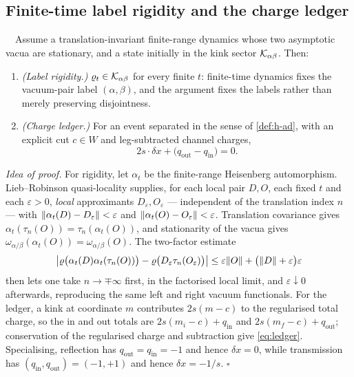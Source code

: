 \subsection{Finite-time label rigidity and the charge ledger}

\begin{theorem}
\label{thm:B3}
\statusProved\ \ Assume a translation-invariant finite-range dynamics whose two
asymptotic vacua are stationary, and a state initially in the kink sector
$\mathcal{K}_{\alpha\beta}$. Then:
\begin{enumerate}
\item \emph{(Label rigidity.)} $\varrho_t\in\mathcal{K}_{\alpha\beta}$ for every finite
  $t$: finite-time dynamics fixes the vacuum-pair label $(\alpha,\beta)$, and
  the argument fixes the labels rather than merely preserving disjointness.
\item \emph{(Charge ledger.)} For an event separated in the sense of
  \cref{def:h-ad}, with an explicit cut $c\in W$ and leg-subtracted channel
  charges,
  \begin{equation}
    2s\cdot\delta x+\bigl(q_{\mathrm{out}}-q_{\mathrm{in}}\bigr)=0 .
    \label{eq:ledger}
  \end{equation}
\end{enumerate}
\end{theorem}

\noindent\emph{Idea of proof.} For rigidity, let $\alpha_t$ be the finite-range
Heisenberg automorphism. Lieb--Robinson quasi-locality supplies, for each local
pair $D,O$, each fixed $t$ and each $\varepsilon>0$, \emph{local} approximants
$D_\varepsilon,O_\varepsilon$ --- independent of the translation index $n$ ---
with $\lVert \alpha_t(D)-D_\varepsilon\rVert<\varepsilon$ and
$\lVert \alpha_t(O)-O_\varepsilon\rVert<\varepsilon$. Translation covariance gives
$\alpha_t(\tau_n(O))=\tau_n(\alpha_t(O))$, and stationarity of the vacua gives
$\omega_{\alpha/\beta}(\alpha_t(O))=\omega_{\alpha/\beta}(O)$. The two-factor
estimate
\begin{equation}
  \bigl|\varrho\bigl(\alpha_t(D)\alpha_t(\tau_n(O))\bigr)
  -\varrho\bigl(D_\varepsilon\tau_n(O_\varepsilon)\bigr)\bigr|
  \le\varepsilon\lVert O\rVert+\bigl(\lVert D\rVert+\varepsilon\bigr)\varepsilon
\end{equation}
then lets one take $n\to\mp\infty$ first, in the factorised local limit, and
$\varepsilon\downarrow0$ afterwards, reproducing the same left and right vacuum
functionals. For the ledger, a kink at coordinate $m$ contributes $2s(m-c)$ to
the regularised total charge, so the in and out totals are
$2s(m_i-c)+q_{\mathrm{in}}$ and $2s(m_f-c)+q_{\mathrm{out}}$; conservation of
the regularised charge and subtraction give \eqref{eq:ledger}. Specialising,
reflection has $q_{\mathrm{out}}=q_{\mathrm{in}}=-1$ and hence $\delta x=0$,
while transmission has $(q_{\mathrm{in}},q_{\mathrm{out}})=(-1,+1)$ and hence
$\delta x=-1/s$. \hfill$\square$

